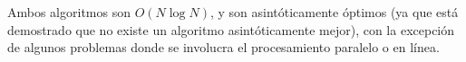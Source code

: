 Ambos algoritmos son $O(N \log N)$, y son asintóticamente óptimos (ya que está demostrado que no existe un algoritmo asintóticamente mejor), con la excepción de algunos problemas donde se involucra el procesamiento paralelo o en línea.
